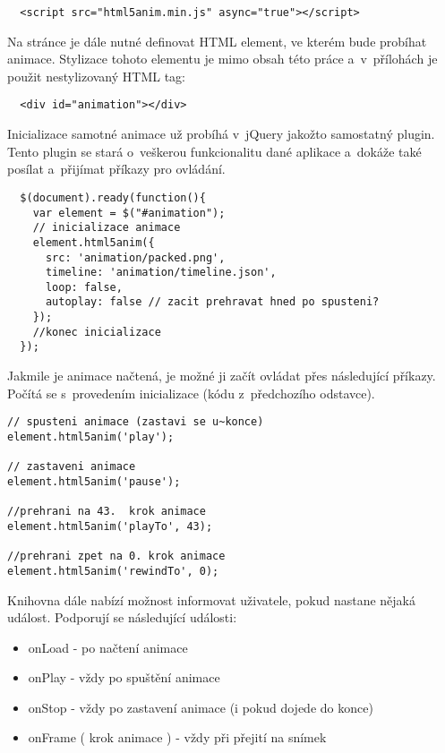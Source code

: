 \begin{lstlisting}
  <script src="html5anim.min.js" async="true"></script>
\end{lstlisting}

Na stránce je dále nutné definovat HTML element, ve kterém bude probíhat animace. Stylizace tohoto elementu je mimo obsah této práce a~v~přílohách je použit nestylizovaný HTML tag:

\begin{lstlisting}
  <div id="animation"></div>
\end{lstlisting}

Inicializace samotné animace už probíhá v~jQuery jakožto samostatný plugin. Tento plugin se stará o~veškerou funkcionalitu dané aplikace a~dokáže také posílat a~přijímat příkazy pro ovládání.

\begin{lstlisting}
  $(document).ready(function(){
    var element = $("#animation");
    // inicializace animace
    element.html5anim({
      src: 'animation/packed.png',
      timeline: 'animation/timeline.json',
      loop: false,
      autoplay: false // zacit prehravat hned po spusteni?
    });
    //konec inicializace
  });
\end{lstlisting}

Jakmile je animace načtená, je možné ji začít ovládat přes následující příkazy. Počítá se s~provedením inicializace (kódu z~předchozího odstavce).

\begin{lstlisting}
// spusteni animace (zastavi se u~konce)
element.html5anim('play');

// zastaveni animace
element.html5anim('pause');

//prehrani na 43.  krok animace
element.html5anim('playTo', 43); 

//prehrani zpet na 0. krok animace
element.html5anim('rewindTo', 0);

\end{lstlisting}

Knihovna dále nabízí možnost informovat uživatele, pokud nastane nějaká událost. Podporují se následující události:

\begin{itemize}
\item onLoad - po načtení animace 
\item onPlay - vždy po spuštění animace
\item onStop - vždy po zastavení animace (i pokud dojede do konce) 
\item onFrame ( krok animace ) - vždy při přejití na snímek

\end{itemize}

